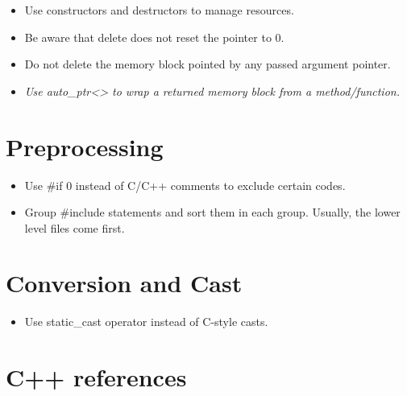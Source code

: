 \documentclass[a4paper,twoside,openright,makeidx,12pt]{report}
\begin{document}
\begin{itemize}
\item Use constructors and destructors to manage resources. 
\item Be aware that delete does not reset the pointer to 0. 
\item Do not delete the memory block pointed by any passed argument pointer. 
\item \textit{Use auto\_ptr<> to wrap a returned memory block from a method/function.}
\end{itemize}

\section{Preprocessing}

\begin{itemize}
\item Use  \#if 0  instead of C/C++ comments to exclude certain codes.
\item Group  \#include  statements and sort them in each group. Usually, the lower level files come first.
\end{itemize}

\section{Conversion and Cast}

\begin{itemize}
\item Use static\_cast operator instead of C-style casts.
\end{itemize}

\section{C++ references}
\end{document}
